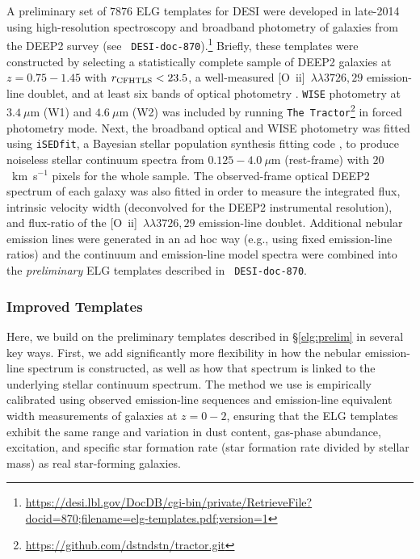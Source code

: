 \documentclass[12pt]{article}
\newcommand{\oiilam}{[O~{\sc ii}]~\ensuremath{\lambda\lambda3726,29}}
\newcommand{\kms}{km~s$^{-1}$}
\newcommand{\isedfit}{{\tt iSEDfit}}
\begin{document}
A preliminary set of $7876$ ELG templates for DESI were developed in late-2014
using high-resolution spectroscopy and broadband photometry of galaxies from the
DEEP2 survey (see {\tt
  DESI-doc-870}).\footnote{\url{https://desi.lbl.gov/DocDB/cgi-bin/private/RetrieveFile?docid=870;filename=elg-templates.pdf;version=1}}
Briefly, these templates were constructed by selecting a statistically complete
sample of DEEP2 galaxies at $z=0.75-1.45$ with $r_{\rm CFHTLS}<23.5$, a
well-measured \oiilam{} emission-line doublet, and at least six bands of optical
photometry \citep{newman13a, matthews13a}.  {\tt WISE} photometry at $3.4~\mu$m
(W1) and $4.6~\mu$m (W2) was included by running {\tt The
  Tractor}\footnote{\url{https://github.com/dstndstn/tractor.git}} in forced
photometry mode.  Next, the broadband optical and WISE photometry was fitted
using \isedfit, a Bayesian stellar population synthesis fitting code
\citep{moustakas13a}, to produce noiseless stellar continuum spectra from
$0.125-4.0~\mu$m (rest-frame) with $20$~\kms{} pixels for the whole sample.  The
observed-frame optical DEEP2 spectrum of each galaxy was also fitted in order to
measure the integrated flux, intrinsic velocity width (deconvolved for the DEEP2
instrumental resolution), and flux-ratio of the \oiilam{} emission-line doublet.
Additional nebular emission lines were generated in an ad hoc way (e.g., using
fixed emission-line ratios) and the continuum and emission-line model spectra
were combined into the \emph{preliminary} ELG templates described in {\tt
  DESI-doc-870}.


\subsubsection{Improved Templates}

Here, we build on the preliminary templates described in \S\ref{elg:prelim} in
several key ways.  First, we add significantly more flexibility in how the
nebular emission-line spectrum is constructed, as well as how that spectrum is
linked to the underlying stellar continuum spectrum.  The method we use is
empirically calibrated using observed emission-line sequences and emission-line
equivalent width measurements of galaxies at $z=0-2$, ensuring that the ELG
templates exhibit the same range and variation in dust content, gas-phase
abundance, excitation, and specific star formation rate (star formation rate
divided by stellar mass) as real star-forming galaxies.
\end{document}
